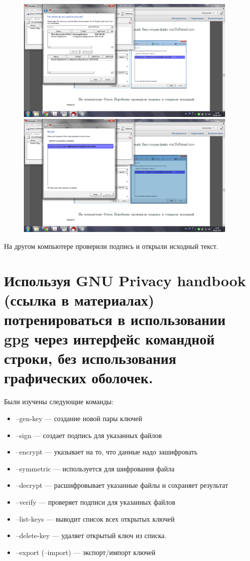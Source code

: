 \documentclass[utf8x, 12pt]{G7-32}
\begin{document}
\begin{figure}[hhh!]
	\begin{center}
		\includegraphics[height=6cm]{img2/271}
		\includegraphics[height=6cm]{img2/272}
	\end{center}
\end{figure}	

На другом компьютере проверили подпись и открыли исходный текст.

\newpage

\section{Используя GNU Privacy handbook (ссылка в материалах) потренироваться в использовании gpg через интерфейс командной строки, без использования графических оболочек.}

Были изучены следующие команды:

\begin{itemize}
	\item –gen-key --- создание новой пары ключей
	\item –sign --- создает подпись для указанных файлов
	\item –encrypt --- указывает на то, что данные надо зашифровать
	\item –symmetric --- используется для шифрования файла
	\item –decrypt --- расшифровывает указанные файлы и сохраняет результат
	\item –verify --- проверяет подписи для указанных файлов
	\item –list-keys --- выводит список всех открытых ключей
	\item –delete-key --- удаляет открытый ключ из списка. 
	\item –export (–import) --- экспорт/импорт ключей
\end{itemize}
\end{document}
